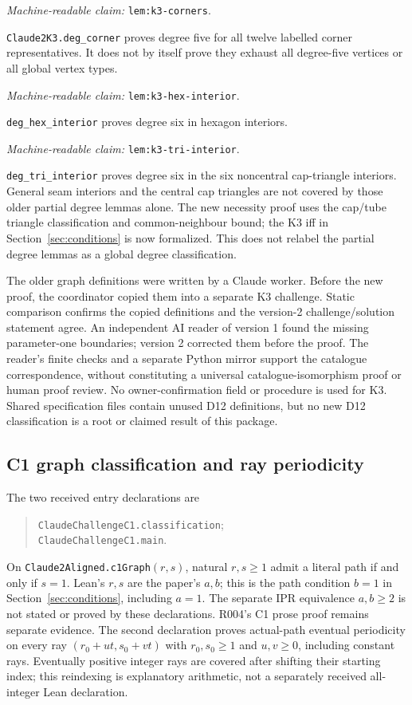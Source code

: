 \documentclass[11pt]{amsart}
\newcommand{\record}[1]{\nolinkurl{#1}}
\newcommand{\claimid}[1]{\par\nopagebreak\noindent\textit{Machine-readable claim:} \record{#1}.\par}
\theoremstyle{definition}\newtheorem{definition}{Definition}
\begin{document}
\label{lem:k3-corners}\claimid{lem:k3-corners}
\record{Claude2K3.deg_corner} proves degree five for all twelve labelled
corner representatives. It does not by itself prove they exhaust all
degree-five vertices or all global vertex types.
\label{lem:k3-hex-interior}\claimid{lem:k3-hex-interior}
\record{deg_hex_interior} proves degree six in hexagon interiors.
\label{lem:k3-tri-interior}\claimid{lem:k3-tri-interior}
\record{deg_tri_interior} proves degree six in the six noncentral cap-triangle interiors.
General seam interiors and the central cap triangles are not covered
by those older partial degree lemmas alone. The new necessity proof
uses the cap/tube triangle classification and common-neighbour bound;
the K3 iff in Section~\ref{sec:conditions} is now formalized. This does
not relabel the partial degree lemmas as a global degree classification.

The older graph definitions were written by a Claude worker. Before
the new proof, the coordinator copied them into a separate K3 challenge.
Static comparison confirms the copied definitions and the version-2
challenge/solution statement agree. An independent AI reader of version 1
found the missing parameter-one boundaries; version 2 corrected them
before the proof. The reader's finite checks and a separate Python mirror
support the catalogue correspondence, without constituting a universal
catalogue-isomorphism proof or human proof review. No owner-confirmation
field or procedure is used for K3. Shared specification files contain
unused D12 definitions, but no new D12 classification is a root or
claimed result of this package.

\subsection{C1 graph classification and ray periodicity}\label{sec:c1-formal}
The two received entry declarations are
\begin{quote}\small\noindent
\record{ClaudeChallengeC1.classification};\\
\record{ClaudeChallengeC1.main}.
\end{quote}
On \record{Claude2Aligned.c1Graph}$(r,s)$, natural $r,s\ge1$ admit a
literal path if and only if $s=1$. Lean's $r,s$ are the paper's $a,b$;
this is the path condition $b=1$ in Section~\ref{sec:conditions},
including $a=1$. The separate IPR equivalence $a,b\ge2$ is not stated
or proved by these declarations. R004's C1 prose proof remains separate
evidence. The second declaration proves actual-path eventual periodicity
on every ray $(r_0+ut,s_0+vt)$ with $r_0,s_0\ge1$ and $u,v\ge0$,
including constant rays. Eventually positive integer rays are covered
after shifting their starting index; this reindexing is explanatory
arithmetic, not a separately received all-integer Lean declaration.
\end{document}
